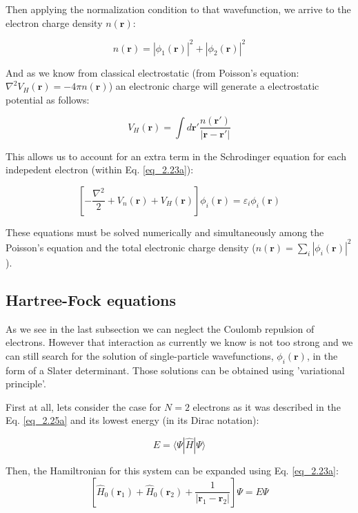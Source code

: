 Then applying the normalization condition to that wavefunction, we arrive to the electron charge density $n(\mathbf{r})$:

\begin{equation}
	n (\mathbf{r}) = |\phi_{1}(\mathbf{r})|^{2} + |\phi_{2}(\mathbf{r})|^{2}
\end{equation}

And as we know from classical electrostatic (from Poisson's equation: $\nabla^{2} V_{H}(\mathbf{r}) = -4 \pi n(\mathbf{r})$) an electronic charge will generate a electrostatic potential as follows:

\begin{equation}
	V_{H} (\mathbf{r}) = \int d \mathbf{r}' \dfrac{n(\mathbf{r}')}{|\mathbf{r}-\mathbf{r}'|}
\end{equation}

This allows us to account for an extra term in the Schrodinger equation for each indepedent electron (within Eq. \ref{eq_2.23a}):


\begin{equation}
	\left[ - \dfrac{\nabla^{2}}{2} + V_{n} (\mathbf{r}) + V_{H}(\mathbf{r})\right] \phi_{i} (\mathbf{r}) = \varepsilon_{i} \phi_{i} (\mathbf{r})
\end{equation}

These equations must be solved numerically and simultaneously among the Poisson's equation and the total electronic charge density ($n(\mathbf{r})= \sum_{i} |\phi_{i} (\mathbf{r})|^{2}$).

\subsection{Hartree-Fock equations}

As we see in the last subsection we can neglect the Coulomb repulsion of electrons. However that interaction as  currently we know is not too strong and we can still search for the  solution of single-particle wavefunctions, $\phi_i(\mathbf{r})$, in the form of a Slater determinant. Those solutions can be obtained using 'variational principle'.

First at all, lets consider the case for $N=2$ electrons as it was described in the Eq. \ref{eq_2.25a} and its lowest energy (in its Dirac notation):

\begin{equation}\label{eq_2.29a}
	E = \langle \Psi | \hat{H}| \Psi\rangle
\end{equation}

Then, the Hamiltronian for this system can be expanded using Eq. \ref{eq_2.23a}:
\begin{equation} \label{eq_2.30a}
\left[\hat{H}_{0}(\mathbf{r}_1)+\hat{H}_{0}(\mathbf{r}_2) + \dfrac{1}{|\mathbf{r}_1 -\mathbf{r}_2|} \right] \Psi = E \Psi	
\end{equation}

